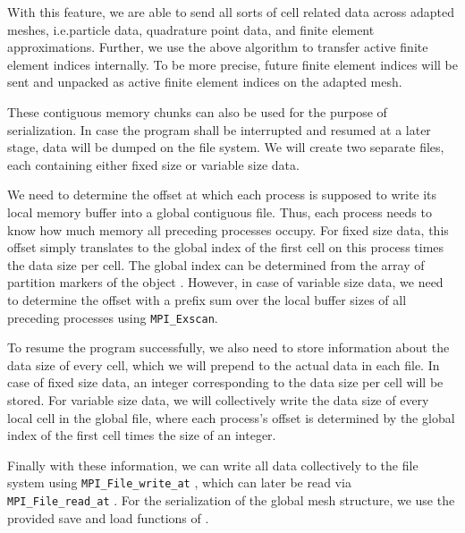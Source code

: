 

With this feature, we are able to send all sorts of cell related data across adapted meshes, i.e.\@ particle data, quadrature point data, and finite element approximations. Further, we use the above algorithm to transfer active finite element indices internally. To be more precise, future finite element indices will be sent and unpacked as active finite element indices on the adapted mesh.

These contiguous memory chunks can also be used for the purpose of serialization. In case the program shall be interrupted and resumed at a later stage, data will be dumped on the file system. We will create two separate files, each containing either fixed size or variable size data.

We need to determine the offset at which each process is supposed to write its local memory buffer into a global contiguous file. Thus, each process needs to know how much memory all preceding processes occupy. For fixed size data, this offset simply translates to the global index of the first cell on this process times the data size per cell. The global index can be determined from the array of partition markers of the \pforest{} object \parencite{burstedde2018}. However, in case of variable size data, we need to determine the offset with a prefix sum over the local buffer sizes of all preceding processes using \texttt{MPI\_Exscan}.

To resume the program successfully, we also need to store information about the data size of every cell, which we will prepend to the actual data in each file. In case of fixed size data, an integer corresponding to the data size per cell will be stored. For variable size data, we will collectively write the data size of every local cell in the global file, where each process's offset is determined by the global index of the first cell times the size of an integer.

Finally with these information, we can write all data collectively to the file system using \texttt{MPI\_File\_write\_at} \textcite{mpi31}, which can later be read via \texttt{MPI\_File\_read\_at} \textcite{mpi31}. For the serialization of the global mesh structure, we use the provided save and load functions of \pforest{}.

